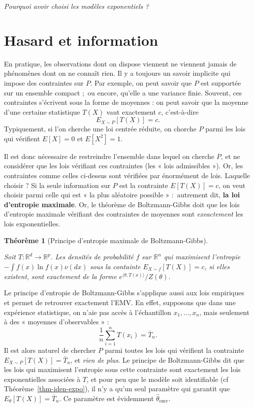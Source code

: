 \documentclass[
  10,
  letterpaper,
  DIV=11,
  numbers=noendperiod]{scrreport}
\newcommand{\emv}{\hat{\theta}_{\mathrm{emv}}}
\theoremstyle{plain}
\newtheorem{theorem}{Théorème}[chapter]
\theoremstyle{definition}
\theoremstyle{plain}
\theoremstyle{definition}
\theoremstyle{definition}
\theoremstyle{plain}
\theoremstyle{remark}
\begin{document}
\emph{Pourquoi avoir choisi les modèles exponentiels ?}

\hypertarget{hasard-et-information}{%
\section{Hasard et information}\label{hasard-et-information}}

En pratique, les observations dont on dispose viennent ne viennent
jamais de phénomènes dont on ne connaît rien. Il y a toujours un savoir
implicite qui impose des contraintes sur \(P\). Par exemple, on peut
savoir que \(P\) est supportée sur un ensemble compact ;~ou encore,
qu'elle a une variance finie. Souvent, ces contraintes s'écrivent sous
la forme de moyennes : on peut savoir que la moyenne d'une certaine
statistique \(T(X)\) vaut exactement \(c\), c'est-à-dire
\[ E_{X\sim P}[T(X)] = c.\] Typiquement, si l'on cherche une loi centrée
réduite, on chorche \(P\) parmi les lois qui vérifient \(E[X]=0\) et
\(E[X^2]=1\).

Il est donc nécessaire de restreindre l'ensemble dans lequel on cherche
\(P\), et ne considérer que les lois vérifiant ces contraintes (les «
lois admissibles »). Or, les contraintes comme celles ci-dessus sont
vérifiées par énormément de lois. Laquelle choisir ? Si la seule
information sur \(P\) est la contrainte \(E[T(X)]=c\), on veut choisir
parmi celle qui est « la plus aléatoire possible » :~autrement dit,
\textbf{la loi d'entropie maximale}. Or, le théorème de Boltzmann-Gibbs
doit que les lois d'entropie maximale vérifiant des contraintes de
moyennes sont \emph{exeactement} les lois exponentielles.

\begin{theorem}[Principe d'entropie maximale de
Boltzmann-Gibbs]\protect\hypertarget{thm-boltzmann-gibbs}{}\label{thm-boltzmann-gibbs}

Soit \(T:\mathbb{R}^d \to \mathbb{R}^p\). Les densités de probabilité
\(f\) sur \(\mathbb{R}^n\) qui maximisent l'entropie
\(-\int f(x) \ln f(x)\nu(dx)\) sous la containte
\(E_{X\sim f}[T(X)]=c\), si elles existent, sont exactement de la forme
\(e^{\langle \theta, T(x)\rangle}/Z(\theta)\).

\end{theorem}

Le principe d'entropie de Boltzmann-Gibbs s'applique aussi aux lois
empiriques et permet de retrouver exactement l'EMV. En effet, supposons
que dans une expérience statistique, on n'aie pas accès à l'échantillon
\(x_1, \dotsc, x_n\), mais seulement à des « moyennes d'observables » :
\[ \frac{1}{n}\sum_{i=1}^n T(x_i) = \bar{T}_n.\] Il est alors naturel de
chercher \(P\) parmi toutes les lois qui vérifient la contrainte
\(E_{X\sim P}[T(X)] = \bar{T}_n\), et \emph{rien de plus}. Le principe
de Boltzmann-Gibbs dit que les lois qui maximisent l'entropie sous cette
contrainte sont exactement les lois exponentielles associées à \(T\), et
pour peu que le modèle soit identifiable (cf
Théorème~\ref{thm-iden-expo}), il n'y a qu'un seul paramètre qui
garantit que \(E_\theta[T(X)] = \bar{T}_n\). Ce paramètre est évidemment
\(\emv\).
\end{document}
